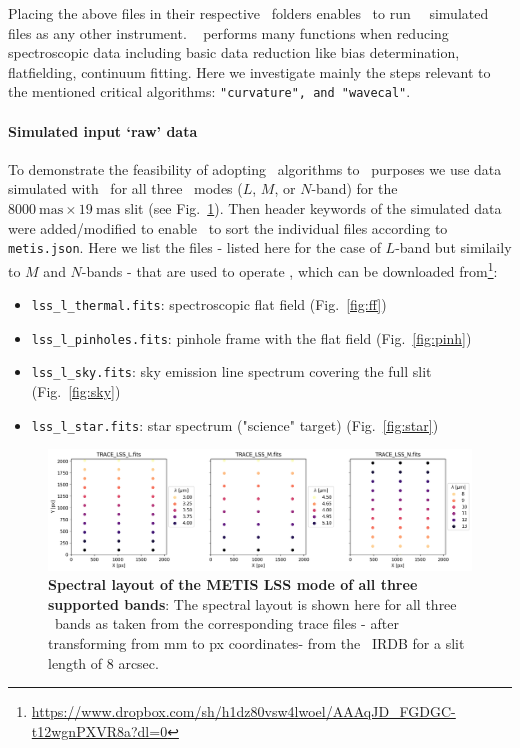 Placing the above files in their respective \pyred~folders enables \pyred~to run \met~\scope~simulated files as any other instrument. \pyred~ performs many functions when reducing spectroscopic data  including basic data reduction like bias determination, flatfielding, continuum fitting. Here we investigate mainly the steps relevant to the mentioned critical algorithms: \texttt{"curvature", and "wavecal"}.
\paragraph{Simulated input `raw' data}
To demonstrate the feasibility of adopting \pyred~algorithms to \metis~purposes we use data simulated with \scope~for all three \lss~modes ($L$, $M$, or $N$-band) for the $8000~\textrm{mas} \times 19~\textrm{mas}$ slit (see Fig.~\ref{fig:lmn_layout}). 
Then header keywords of the simulated data were added/modified to enable \pyred~to sort the individual files according to \texttt{metis.json}. Here we list the files - listed here for the case of $L$-band but similaily to $M$ and $N$-bands - that are used to operate \pyred, which can be downloaded from\footnote{\url{https://www.dropbox.com/sh/h1dz80vsw4lwoel/AAAqJD_FGDGC-t12wgnPXVR8a?dl=0}}: 
\begin{itemize}
   \item \texttt{lss\_l\_thermal.fits}: spectroscopic flat field (Fig.~\ref{fig:ff})
   \item \texttt{lss\_l\_pinholes.fits}: pinhole frame with the flat field (Fig.~\ref{fig:pinh})
   \item \texttt{lss\_l\_sky.fits}: sky emission line spectrum covering the full slit (Fig.~\ref{fig:sky})
   \item \texttt{lss\_l\_star.fits}: star spectrum ("science" target) (Fig.~\ref{fig:star})
\end{itemize}

\begin{figure}[!h]
  \centering
  \includegraphics[width=\textwidth]{figures/LSS_CrtAlg_files/METIS_LSS_SpectralLayout_px.png}
  \caption{\textbf{Spectral layout of the METIS LSS mode of all three supported bands}: The spectral layout is shown here for all three \lss~bands as taken from the corresponding trace files - after transforming from mm to px coordinates- from the \met~IRDB for a slit length of 8 arcsec.}

  \label{fig:lmn_layout}
\end{figure}

